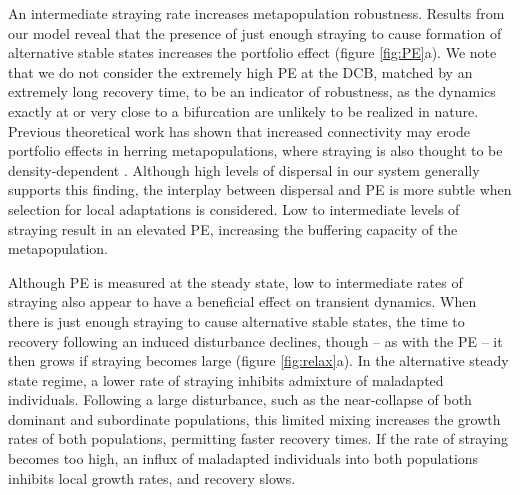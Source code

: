 \documentclass{revtex4}
\begin{document}
An intermediate straying rate increases metapopulation robustness. 
Results from our model reveal that the presence of just enough straying to cause formation of alternative stable states increases the portfolio effect (figure \ref{fig:PE}a). 
We note that we do not consider the extremely high PE at the DCB, matched by an extremely long recovery time, to be an indicator of robustness, as the dynamics exactly at or very close to a bifurcation are unlikely to be realized in nature.
Previous theoretical work has shown that increased connectivity may erode portfolio effects in herring metapopulations, where straying is also thought to be density-dependent \citep{Secor:2009ena}.
Although high levels of dispersal in our system generally supports this finding, the interplay between dispersal and PE is more subtle when selection for local adaptations is considered.
Low to intermediate levels of straying result in an elevated PE, increasing the buffering capacity of the metapopulation.

Although PE is measured at the steady state, low to intermediate rates of straying also appear to have a beneficial effect on transient dynamics.
When there is just enough straying to cause alternative stable states, the time to recovery following an induced disturbance declines, though -- as with the PE -- it then grows if straying becomes large (figure \ref{fig:relax}a).
In the alternative steady state regime, a lower rate of straying inhibits admixture of maladapted individuals.
Following a large disturbance, such as the near-collapse of both dominant and subordinate populations, this limited mixing increases the growth rates of both populations, permitting faster recovery times. 
If the rate of straying becomes too high, an influx of maladapted individuals into both populations inhibits local growth rates, and recovery slows.

\end{document}
